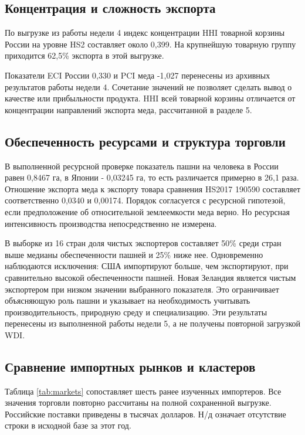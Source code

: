 \documentclass[12pt,a4paper]{article}
\begin{document}
\subsection{Концентрация и сложность экспорта}
По выгрузке из работы недели 4 индекс концентрации HHI товарной корзины России на уровне HS2 составляет около 0,399. На крупнейшую товарную группу приходится 62,5\% экспорта в этой выгрузке.

Показатели ECI России 0,330 и PCI меда -1,027 перенесены из архивных результатов работы недели 4. Сочетание значений не позволяет сделать вывод о качестве или прибыльности продукта. HHI всей товарной корзины отличается от концентрации направлений экспорта меда, рассчитанной в разделе 5.

\subsection{Обеспеченность ресурсами и структура торговли}
В выполненной ресурсной проверке показатель пашни на человека в России равен 0,8467 га, в Японии - 0,03245 га, то есть различается примерно в 26,1 раза. Отношение экспорта меда к экспорту товара сравнения HS2017 190590 составляет соответственно 0,0340 и 0,00174. Порядок согласуется с ресурсной гипотезой, если предположение об относительной землеемкости меда верно. Но ресурсная интенсивность производства непосредственно не измерена.

В выборке из 16 стран доля чистых экспортеров составляет 50\% среди стран выше медианы обеспеченности пашней и 25\% ниже нее. Одновременно наблюдаются исключения: США импортируют больше, чем экспортируют, при сравнительно высокой обеспеченности пашней. Новая Зеландия является чистым экспортером при низком значении выбранного показателя. Это ограничивает объясняющую роль пашни и указывает на необходимость учитывать производительность, природную среду и специализацию. Эти результаты перенесены из выполненной работы недели 5, а не получены повторной загрузкой WDI.

\subsection{Сравнение импортных рынков и кластеров}
Таблица \ref{tab:markets} сопоставляет шесть ранее изученных импортеров. Все значения торговли повторно рассчитаны на полной сохраненной выгрузке. Российские поставки приведены в тысячах долларов. Н/д означает отсутствие строки в исходной базе за этот год.
\end{document}
